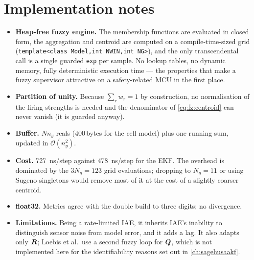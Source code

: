 \section{Implementation notes}
\begin{itemize}[leftmargin=1.4em]
\item \textbf{Heap-free fuzzy engine.}  The membership functions are evaluated in closed form, the
      aggregation and centroid are computed on a compile-time-sized grid
      (\texttt{template<class Model,int NWIN,int NG>}), and the only transcendental call is a single
      guarded \texttt{exp} per sample.  No lookup tables, no dynamic memory, fully deterministic
      execution time --- the properties that make a fuzzy supervisor attractive on a safety-related
      MCU in the first place.
\item \textbf{Partition of unity.}  Because $\sum_r w_r = 1$ by construction, no normalisation of
      the firing strengths is needed and the denominator of \eqref{eq:fz:centroid} can never vanish
      (it is guarded anyway).
\item \textbf{Buffer.}  $N n_y$ reals ($400$\,bytes for the cell model) plus one running sum,
      updated in $\mathcal{O}(n_y^2)$.
\item \textbf{Cost.}  \SI{727}{\nano\second}/step against \SI{478}{\nano\second}/step for the EKF.
      The overhead is dominated by the $3N_g=123$ grid evaluations; dropping to $N_g=11$ or using
      Sugeno singletons would remove most of it at the cost of a slightly coarser centroid.
\item \textbf{float32.}  Metrics agree with the double build to three digits; no divergence.
\item \textbf{Limitations.}  Being a rate-limited IAE, it inherits IAE's inability to distinguish
      sensor noise from model error, and it adds a lag.  It also adapts only $\bm{R}$; Loebis et al.\
      use a second fuzzy loop for $\bm{Q}$, which is not implemented here for the identifiability
      reasons set out in \cref{ch:sagehusaakf}.
\end{itemize}

